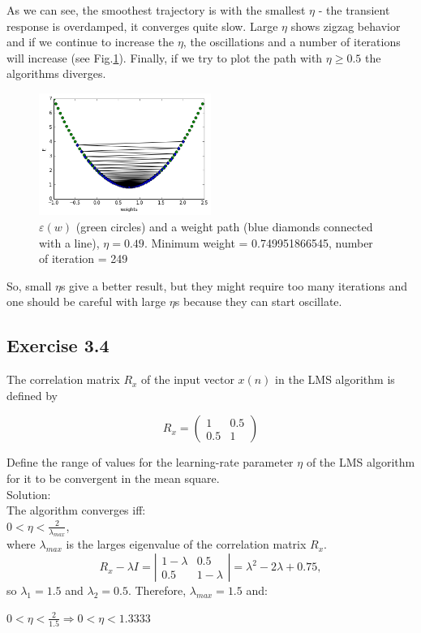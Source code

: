 \documentclass[a4paper, 12pt]{article}
\begin{document}
As we can see, the smoothest trajectory is with the smallest $\eta$ - the transient response is overdamped, it converges quite slow. Large $\eta$ shows zigzag behavior and if we continue to increase the $\eta$, the oscillations and a number of iterations will increase (see Fig.\ref{fig:EFunction049}). Finally, if we try to plot the path with $\eta \geqslant 0.5$ the algorithms diverges.

\begin{figure}[h]
  \centering
  \caption{$\varepsilon(w)$ (green circles) and a weight path (blue diamonds connected with a line), $\eta = 0.49$. Minimum weight = 0.749951866545, number of iteration = 249  \label{fig:EFunction049}}
  \includegraphics[width=0.5\textwidth]{EFunction049}
\end{figure}

So, small $\eta$s give a better result, but they might require too many iterations and one should be careful with large $\eta$s because they can start oscillate.\\

\cleardoublepage	

\subsection*{Exercise 3.4}
The correlation matrix $R_x$ of the input vector $x(n)$ in the LMS algorithm is defined by

\[ R_x = \left( \begin{array}{ccc}
1 & 0.5 \\
0.5  & 1 \end{array} \right)\] 

Define the range of values for the learning-rate parameter $\eta$ of the LMS algorithm for it to be convergent in the mean square.\\

Solution:\\

The algorithm converges iff:\\

$0 < \eta < \frac{2}{\lambda_{max}}$,\\
where $\lambda_{max}$ is the larges eigenvalue of the correlation matrix $R_x$.\\

 \[ R_x - \lambda I = \left| \begin{array}{ccc}
1 - \lambda & 0.5 \\
0.5 & 1 - \lambda \end{array} \right| = \lambda^2 - 2\lambda + 0.75,\]
so $\lambda_1 = 1.5$ and $\lambda_2 = 0.5$. Therefore, $\lambda_{max} = 1.5$ and:

$0 < \eta < \frac{2}{1.5} \Rightarrow 0 < \eta < 1.3333$
\end{document}
